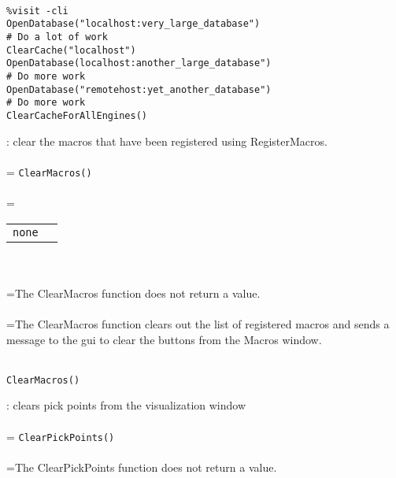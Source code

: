 \documentclass[10pt,a4paper]{report}
\begin{document}
\\[-6mm]
\begin{verbatim}%visit -cli
OpenDatabase("localhost:very_large_database")
# Do a lot of work
ClearCache("localhost")
OpenDatabase(localhost:another_large_database")
# Do more work
OpenDatabase("remotehost:yet_another_database")
# Do more work
ClearCacheForAllEngines()
\end{verbatim}
\newpage


{}
: clear the macros that have been registered using RegisterMacros.\\[-3mm]

 \\ 
\hangindent=\parindent 
\verb!ClearMacros()!\\ [-3mm]

 \\ 
\hangindent=\parindent 
\begin{tabular}{ll}
\verb!none! &  \\
\end{tabular} \\[-2mm]


 \\ 
\hangindent=\parindent The ClearMacros function does not return a value. \\[-3mm] 

 \\ 
\hangindent=\parindent The ClearMacros function clears out the list of registered macros and sends a message to the gui to clear the buttons from the Macros window. \\[-3mm] 

\\[-6mm]
\begin{verbatim}ClearMacros()
\end{verbatim}
\newpage


{}
: clears pick points from the visualization window\\[-3mm]

 \\ 
\hangindent=\parindent 
\verb!ClearPickPoints()!\\ [-3mm]

 \\ 
\hangindent=\parindent The ClearPickPoints function does not return a value. \\[-3mm] 
\end{document}
